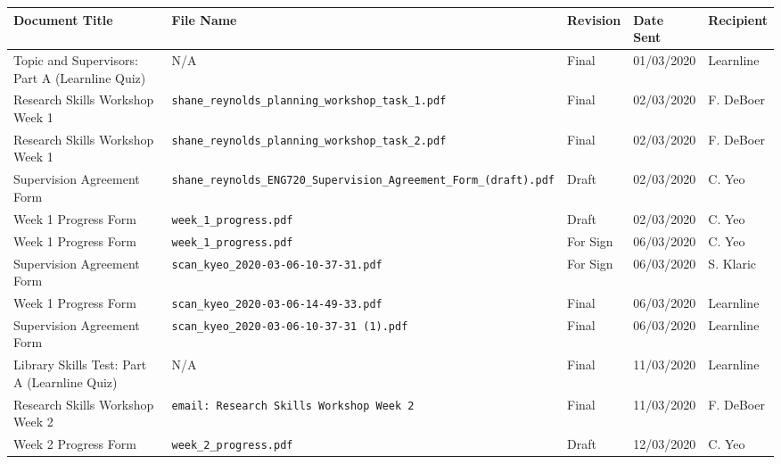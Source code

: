 \documentclass[10pt, landscape]{article}
\begin{document}
	\small
	\begin{longtable}{p{7cm}p{10cm}p{1.5cm}p{2cm}p{2cm}}
	\toprule
	\textbf{Document Title}							& \textbf{File Name}				& \textbf{Revision} & \textbf{Date Sent} 	& \textbf{Recipient} \\
	\midrule
	\endhead
	Topic and Supervisors: Part A (Learnline Quiz)	& N/A																		& Final 			& 01/03/2020		 	& Learnline\\
	
	Research Skills Workshop Week 1					& \verb|shane_reynolds_planning_workshop_task_1.pdf|						& Final				& 02/03/2020		 	& F. DeBoer\\
	
	Research Skills Workshop Week 1					& \verb|shane_reynolds_planning_workshop_task_2.pdf|						& Final				& 02/03/2020			& F. DeBoer\\
	
	Supervision Agreement Form						& \verb|shane_reynolds_ENG720_Supervision_Agreement_Form_(draft).pdf|		& Draft				& 02/03/2020			& C. Yeo\\
	
	Week 1 Progress Form							& \verb|week_1_progress.pdf|												& Draft				& 02/03/2020			& C. Yeo\\
	
	Week 1 Progress Form							& \verb|week_1_progress.pdf|												& For Sign			& 06/03/2020			& C. Yeo\\
	
	Supervision Agreement Form						& \verb|scan_kyeo_2020-03-06-10-37-31.pdf|									& For Sign			& 06/03/2020			& S. Klaric\\
	
	Week 1 Progress Form							& \verb|scan_kyeo_2020-03-06-14-49-33.pdf|									& Final				& 06/03/2020			& Learnline\\
	
	Supervision Agreement Form						& \verb|scan_kyeo_2020-03-06-10-37-31 (1).pdf|								& Final				& 06/03/2020			& Learnline\\
	
	Library Skills Test: Part A (Learnline Quiz)	& N/A																		& Final 			& 11/03/2020		 	& Learnline\\
	
	Research Skills Workshop Week 2					& \verb|email: Research Skills Workshop Week 2|								& Final				& 11/03/2020		 	& F. DeBoer\\
	
	Week 2 Progress Form							& \verb|week_2_progress.pdf|												& Draft				& 12/03/2020			& C. Yeo\\
	

\end{longtable}
\end{document}
